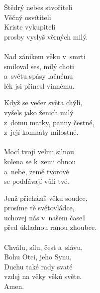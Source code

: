 \begin{translatioMulticol}{3}
Štědrý nebes stvořiteli\\
Věčný osvítiteli\\
Kriste vykupiteli\\
prosby vyslyš věrných milý.\\
\\
Nad zánikem věku v~smrti\\
smiloval ses, milý choti\\
a~světu spásy lačnému\\
lék jsi přinesl vinnému.\columnbreak

Když se večer světa chýlí,\\
vyšels jako ženich milý\\
z~domu matky, panny čestné,\\
z~její komnaty milostné.\\
\\
Mocí tvojí velmi silnou\\
kolena se k~zemi ohnou\\
a~nebe, země tvorové\\
se poddávají vůli tvé.\columnbreak

Jenž přicházíš věku soudce,\\
prosíme tě světovládce,\\
uchovej nás v~našem čase1\\
před úkladnou ranou zhoubce.\\
\\
Chválu, sílu, čest a~slávu,\\
Bohu Otci, jeho Synu,\\
Duchu také rady svaté\\
vzdej na věky věků světe.\\
Amen.
\end{translatioMulticol}
